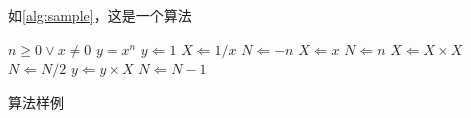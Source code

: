 \par 如\autoref{alg:sample}，这是一个算法

\begin{algorithm}[H]
    \begin{algorithmic} %
        \REQUIRE $n \geq 0 \vee x \neq 0$
        \ENSURE $y = x^n$
        \STATE $y \Leftarrow 1$
        \STATE $X \Leftarrow 1 / x$
        \STATE $N \Leftarrow -n$
        \ELSE
        \STATE $X \Leftarrow x$
        \STATE $N \Leftarrow n$
        \ENDIF
        \STATE $X \Leftarrow X \times X$
        \STATE $N \Leftarrow N / 2$
        \ELSE[$N$ is odd]
        \STATE $y \Leftarrow y \times X$
        \STATE $N \Leftarrow N - 1$
        \ENDIF
        \ENDWHILE
    \end{algorithmic}
    \caption{\label{alg:sample}算法样例}
\end{algorithm}